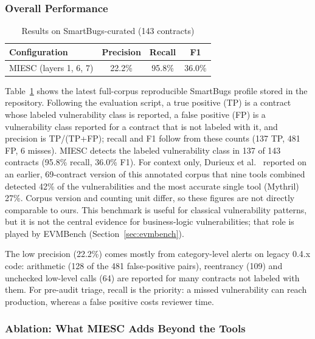 \documentclass[conference]{IEEEtran}
\begin{document}
\subsubsection{Overall Performance}

\begin{table}[htbp]
\caption{Results on SmartBugs-curated (143 contracts)}
\label{tab:smartbugs}
\centering
\begin{tabular}{@{}lccc@{}}
\toprule
\textbf{Configuration} & \textbf{Precision} & \textbf{Recall} & \textbf{F1} \\
\midrule
MIESC (layers 1, 6, 7) & 22.2\% & 95.8\% & 36.0\% \\
\bottomrule
\end{tabular}
\end{table}

Table~\ref{tab:smartbugs} shows the latest full-corpus reproducible SmartBugs profile stored in the repository. Following the evaluation script, a true positive (TP) is a contract whose labeled vulnerability class is reported, a false positive (FP) is a vulnerability class reported for a contract that is not labeled with it, and precision is TP/(TP+FP); recall and F1 follow from these counts (137 TP, 481 FP, 6 misses). MIESC detects the labeled vulnerability class in 137 of 143 contracts (95.8\% recall, 36.0\% F1). For context only, Durieux et al.~\cite{durieux2020empirical} reported on an earlier, 69-contract version of this annotated corpus that nine tools combined detected 42\% of the vulnerabilities and the most accurate single tool (Mythril) 27\%. Corpus version and counting unit differ, so these figures are not directly comparable to ours. This benchmark is useful for classical vulnerability patterns, but it is not the central evidence for business-logic vulnerabilities; that role is played by EVMBench (Section~\ref{sec:evmbench}).

The low precision (22.2\%) comes mostly from category-level alerts on legacy 0.4.x code: arithmetic (128 of the 481 false-positive pairs), reentrancy (109) and unchecked low-level calls (64) are reported for many contracts not labeled with them. For pre-audit triage, recall is the priority: a missed vulnerability can reach production, whereas a false positive costs reviewer time.

\subsubsection{Ablation: What MIESC Adds Beyond the Tools}
\label{sec:ablation}
\end{document}
